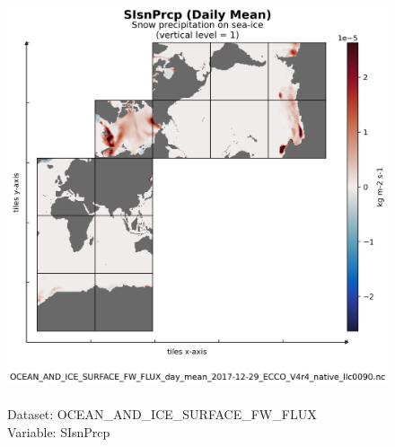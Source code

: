 \begin{figure}[H]
\centering
\includegraphics[scale=0.5]{../images/plots/native_plots/Ocean_and_Sea-Ice_Surface_Freshwater_Fluxes/SIsnPrcp.png}
\caption{\\Dataset: OCEAN\_AND\_ICE\_SURFACE\_FW\_FLUX\\Variable: SIsnPrcp}
\label{tab:table-OCEAN_AND_ICE_SURFACE_FW_FLUX_SIsnPrcp-Plot}
\end{figure}
\pagebreak
